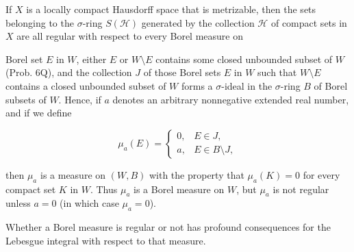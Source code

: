 If $X$ is a locally compact Hausdorff space that is metrizable, then the sets belonging to the $\sigma$-ring $S(\mathcal{H})$ generated by the collection $\mathcal{H}$ of compact sets in $X$ are all regular with respect to every Borel measure on

Borel set $E$ in $W$, either $E$ or $W \setminus E$ contains some closed unbounded subset of $W$ (Prob. 6Q), and the collection $J$ of those Borel sets $E$ in $W$ such that $W \setminus E$ contains a closed unbounded subset of $W$ forms a $\sigma$-ideal in the $\sigma$-ring $B$ of Borel subsets of $W$. Hence, if $a$ denotes an arbitrary nonnegative extended real number, and if we define

$$\mu_a(E) = \begin{cases} 0, & E \in J, \\ a, & E \in B \setminus J, \end{cases}$$

then $\mu_a$ is a measure on $(W, B)$ with the property that $\mu_a(K) = 0$ for every compact set $K$ in $W$. Thus $\mu_a$ is a Borel measure on $W$, but $\mu_a$ is not regular unless $a = 0$ (in which case $\mu_a = 0$).

Whether a Borel measure is regular or not has profound consequences for the Lebesgue integral with respect to that measure.
